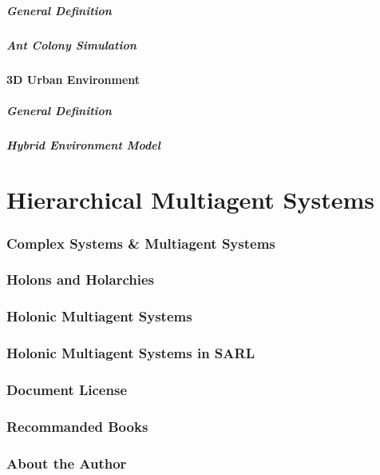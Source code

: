 \begin{bibliographysection}
	\subsubsection{General Definition}
	
	\subsubsection{Ant Colony Simulation}
	

	\subsection[3D Environment]{{3D} Urban Environment}
	\subsubsection{General Definition}
	
	\subsubsection{Hybrid Environment Model}
	

\end{bibliographysection}

\part{Hierarchical Multiagent Systems}
\begin{bibliographysection}

	\section{Complex Systems \& Multiagent Systems}
	
	\section{Holons and Holarchies}
	
	\section{Holonic Multiagent Systems}
	
	\section{Holonic Multiagent Systems in SARL}
	

\end{bibliographysection}

\appendix
\section{Document License}

\section{Recommanded Books}

\section{About the Author}


\endinput
